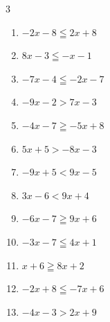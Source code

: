 \begin{multicols}{3}
\begin{enumerate}
  \item $-2x-8\leqq 2x+8$

        \phantom{$\displaystyle x\geqq -4$}

  \item $8x-3\leqq -x-1$


  \item $-7x-4\leqq -2x-7$


  \item $-9x-2>7x-3$


  \item $-4x-7\geqq -5x+8$

        \phantom{$\displaystyle x\geqq 15$}

  \item $5x+5>-8x-3$


  \item $-9x+5<9x-5$


  \item $3x-6<9x+4$


  \item $-6x-7\geqq 9x+6$


  \item $-3x-7\leqq 4x+1$


\columnbreak %

  \item $x+6\geqq 8x+2$


  \item $-2x+8\leqq -7x+6$


  \item $-4x-3>2x+9$

        \phantom{$\displaystyle x<-2$}


\end{enumerate}
\end{multicols}
